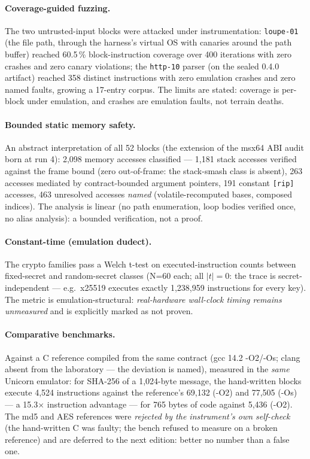 \documentclass[11pt,a4paper]{article}
\newcommand{\code}[1]{\texttt{\small #1}}
\begin{document}
\paragraph{Coverage-guided fuzzing.} The two untrusted-input blocks were
attacked under instrumentation: \code{loupe-01} (the file path, through
the harness's virtual OS with canaries around the path buffer) reached
60.5\,\% block-instruction coverage over 400 iterations with zero crashes
and zero canary violations; the \code{http-10} parser (on the sealed 0.4.0
artifact) reached 358 distinct instructions with zero emulation crashes
and zero named faults, growing a 17-entry corpus. The limits are stated:
coverage is per-block under emulation, and crashes are emulation faults,
not terrain deaths.

\paragraph{Bounded static memory safety.} An abstract interpretation of
all 52 blocks (the extension of the msx64 ABI audit born at run 4):
2{,}098 memory accesses classified --- 1{,}181 stack accesses verified
against the frame bound (zero out-of-frame: the stack-smash class is
absent), 263 accesses mediated by contract-bounded argument pointers, 191
constant \code{[rip]} accesses, 463 unresolved accesses \emph{named}
(volatile-recomputed bases, composed indices). The analysis is linear
(no path enumeration, loop bodies verified once, no alias analysis): a
bounded verification, not a proof.

\paragraph{Constant-time (emulation dudect).} The crypto families pass a
Welch t-test on executed-instruction counts between fixed-secret and
random-secret classes (N=60 each; all $|t| = 0$: the trace is
secret-independent --- e.g.\ x25519 executes exactly 1{,}238{,}959
instructions for every key). The metric is emulation-structural:
\emph{real-hardware wall-clock timing remains unmeasured} and is
explicitly marked as not proven.

\paragraph{Comparative benchmarks.} Against a C reference compiled from
the same contract (gcc 14.2 -O2/-Os; clang absent from the laboratory ---
the deviation is named), measured in the \emph{same} Unicorn emulator:
for SHA-256 of a 1{,}024-byte message, the hand-written blocks execute
4{,}524 instructions against the reference's 69{,}132 (-O2) and 77{,}505
(-Os) --- a 15.3$\times$ instruction advantage --- for 765 bytes of code
against 5{,}436 (-O2). The md5 and AES references were \emph{rejected by
the instrument's own self-check} (the hand-written C was faulty; the
bench refused to measure on a broken reference) and are deferred to the
next edition: better no number than a false one.
\end{document}
